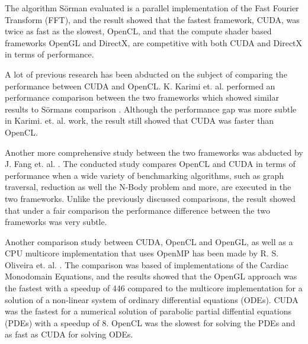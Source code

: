 The algorithm Sörman evaluated is a parallel implementation of the Fast Fourier Transform (FFT), and the result showed that the fastest framework, CUDA, was twice as fast as the slowest, OpenCL, and that the compute shader based frameworks OpenGL and DirectX, are competitive with both CUDA and DirectX in terms of performance.

A lot of previous research has been abducted on the subject of comparing the performance between CUDA and OpenCL. K. Karimi et. al. performed an performance comparison between the two frameworks which showed similar results to Sörmans comparison \cite{karimi2010performance}. Although the performance gap was more subtle in Karimi. et. al. work, the result still showed that CUDA was faster than OpenCL. 

Another more comprehensive study between the two frameworks was abducted by J. Fang et. al. \cite{fang2011comprehensive}. The conducted study compares OpenCL and CUDA in terms of performance when a wide variety of benchmarking algorithms, such as graph traversal, reduction as well the N-Body problem and more, are executed in the two frameworks. Unlike the previously discussed comparisons, the result showed that under a fair comparison the performance difference between the two frameworks was very subtle. 

Another comparison study between CUDA, OpenCL and OpenGL, as well as a CPU multicore implementation that uses OpenMP has been made by R. S. Oliveira et. al. \cite{oliveira2011comparing}. The comparison was based of implementations of the Cardiac Monodomain Equations, and the results showed that the OpenGL approach was the fastest with a speedup of 446 compared to the multicore implementation for a solution of a non-linear system of ordinary differential equations (ODEs). CUDA was the fastest for a numerical solution of parabolic partial diffential equations (PDEs) with a speedup of 8. OpenCL was the slowest for solving the PDEs and as fast as CUDA for solving ODEs.


